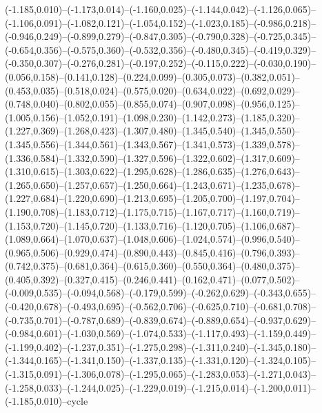 \documentclass[10pt]{article}
\begin{document}
(-1.185,0.010)--(-1.173,0.014)--(-1.160,0.025)--(-1.144,0.042)--(-1.126,0.065)--(-1.106,0.091)--(-1.082,0.121)--(-1.054,0.152)--(-1.023,0.185)--(-0.986,0.218)--(-0.946,0.249)--(-0.899,0.279)--(-0.847,0.305)--(-0.790,0.328)--(-0.725,0.345)--(-0.654,0.356)--(-0.575,0.360)--(-0.532,0.356)--(-0.480,0.345)--(-0.419,0.329)--(-0.350,0.307)--(-0.276,0.281)--(-0.197,0.252)--(-0.115,0.222)--(-0.030,0.190)--(0.056,0.158)--(0.141,0.128)--(0.224,0.099)--(0.305,0.073)--(0.382,0.051)--(0.453,0.035)--(0.518,0.024)--(0.575,0.020)--(0.634,0.022)--(0.692,0.029)--(0.748,0.040)--(0.802,0.055)--(0.855,0.074)--(0.907,0.098)--(0.956,0.125)--(1.005,0.156)--(1.052,0.191)--(1.098,0.230)--(1.142,0.273)--(1.185,0.320)--(1.227,0.369)--(1.268,0.423)--(1.307,0.480)--(1.345,0.540)--(1.345,0.550)--(1.345,0.556)--(1.344,0.561)--(1.343,0.567)--(1.341,0.573)--(1.339,0.578)--(1.336,0.584)--(1.332,0.590)--(1.327,0.596)--(1.322,0.602)--(1.317,0.609)--(1.310,0.615)--(1.303,0.622)--(1.295,0.628)--(1.286,0.635)--(1.276,0.643)--(1.265,0.650)--(1.257,0.657)--(1.250,0.664)--(1.243,0.671)--(1.235,0.678)--(1.227,0.684)--(1.220,0.690)--(1.213,0.695)--(1.205,0.700)--(1.197,0.704)--(1.190,0.708)--(1.183,0.712)--(1.175,0.715)--(1.167,0.717)--(1.160,0.719)--(1.153,0.720)--(1.145,0.720)--(1.133,0.716)--(1.120,0.705)--(1.106,0.687)--(1.089,0.664)--(1.070,0.637)--(1.048,0.606)--(1.024,0.574)--(0.996,0.540)--(0.965,0.506)--(0.929,0.474)--(0.890,0.443)--(0.845,0.416)--(0.796,0.393)--(0.742,0.375)--(0.681,0.364)--(0.615,0.360)--(0.550,0.364)--(0.480,0.375)--(0.405,0.392)--(0.327,0.415)--(0.246,0.441)--(0.162,0.471)--(0.077,0.502)--(-0.009,0.535)--(-0.094,0.568)--(-0.179,0.599)--(-0.262,0.629)--(-0.343,0.655)--(-0.420,0.678)--(-0.493,0.695)--(-0.562,0.706)--(-0.625,0.710)--(-0.681,0.708)--(-0.735,0.701)--(-0.787,0.689)--(-0.839,0.674)--(-0.889,0.654)--(-0.937,0.629)--(-0.984,0.601)--(-1.030,0.569)--(-1.074,0.533)--(-1.117,0.493)--(-1.159,0.449)--(-1.199,0.402)--(-1.237,0.351)--(-1.275,0.298)--(-1.311,0.240)--(-1.345,0.180)--(-1.344,0.165)--(-1.341,0.150)--(-1.337,0.135)--(-1.331,0.120)--(-1.324,0.105)--(-1.315,0.091)--(-1.306,0.078)--(-1.295,0.065)--(-1.283,0.053)--(-1.271,0.043)--(-1.258,0.033)--(-1.244,0.025)--(-1.229,0.019)--(-1.215,0.014)--(-1.200,0.011)--(-1.185,0.010)--cycle 
\end{document}
